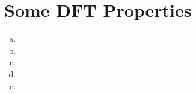 \section{Some DFT Properties}\label{sec:p5}

\begin{enumerate}[(a)]
	\item 
	\item 
	\item 
	\item 
	\item 
\end{enumerate}